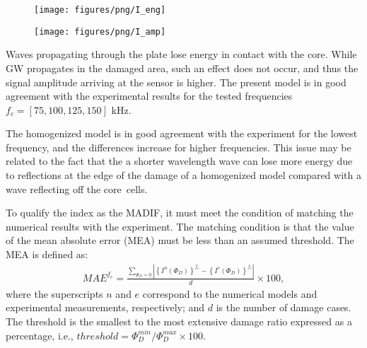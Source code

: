 \documentclass[sensors,article,accept,moreauthors,pdftex]{Definitions/mdpi}
\begin{document}
\begin{paracol}{2}
\vspace{-6pt}
\begin{figure}[H]
		\texttt{[image: figures/png/I\_eng]}
	\caption{}
	\label{fig:madif_eng}
\end{figure}
\vspace{-9pt}
\begin{figure}[H]
		\texttt{[image: figures/png/I\_amp]}
	\caption{}
	\label{fig:madif_amp}
\end{figure}


Waves propagating through the plate lose energy in contact with the core.
While GW propagates in the damaged area, such an effect does not occur, and thus the signal amplitude arriving at the sensor is higher.
The present model is in good agreement with the experimental results for the tested frequencies  \(f_c=[75, 100, 125, 150]\) kHz. 


The homogenized model is in good agreement with the experiment for the lowest frequency, and the differences increase for higher frequencies.
This issue may be related to the fact that the  a shorter wavelength wave can lose more energy due to reflections at the edge of the damage of a homogenized model compared with a wave reflecting off the core~cells.

To qualify the index as the MADIF, it must meet the condition of matching the numerical results with the experiment.
The matching condition is that the value of the mean absolute error (MEA) must be less than an assumed threshold.
The MEA is defined as:
\begin{eqnarray}
	MAE^{f_c} = \frac{\sum_{\Phi_D=0}{\left |\left\{I^{n}(\Phi_D)\right\}^{f_c}-\left\{I^{e}(\Phi_D)\right\}^{f_c}\right |}}{d}\times100,
\end{eqnarray}
where the superscripts \(n\) and \(e\) correspond to the numerical models and experimental measurements, respectively; and \(d\) is the number of damage cases. The threshold is the smallest to the most extensive damage ratio expressed as a percentage, i.e., \(threshold=\Phi_D^{min}/\Phi_D^{max}\times100\).


\end{paracol}
\end{document}
